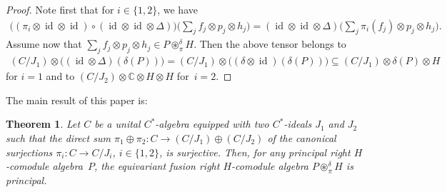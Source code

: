 \documentclass[pdftex]{sigma}
\numberwithin{equation}{section}
\newtheorem{Theorem}{Theorem}[section]
\begin{document}
\begin{proof}
Note f\/irst that for $i\in\{1,2\}$, we have
\begin{gather*}
\big((\pi_i\otimes\operatorname{id}\otimes\operatorname{id})\circ(\operatorname{id}\otimes\operatorname{id}\otimes\Delta)\big)\!\bigg(\sum_j f_j\otimes p_j\otimes h_j\bigg)
=(\operatorname{id}\otimes\operatorname{id}\otimes\Delta)\!\bigg(\sum_j \pi_i(f_j) \otimes p_j\otimes h_j\bigg).
\end{gather*}
Assume now that $\sum_j f_j\otimes p_j\otimes h_j\in P\circledast^\delta_\pi H$.
 Then the above tensor belongs to
\begin{gather*}
(C/J_1)\otimes \big((\operatorname{id}\otimes\Delta)(\delta(P))\big)=
(C/J_1)\otimes \big((\delta\otimes\operatorname{id})(\delta(P))\big)
\subseteq(C/J_1)\otimes \delta(P)\otimes H
\end{gather*}
for $i=1$ and to $(C/J_2)\otimes \mathbb{C}\otimes H\otimes H$ for~$i=2$.
\end{proof}

The main result of this paper is:
\begin{Theorem}\label{main}
Let $C$ be a unital $C^*$-algebra equipped with two $C^*$-ideals $J_1$ and $ J_2$
such that the direct sum
$
\pi_1\oplus\pi_2\colon C\rightarrow (C/J_1) \oplus (C/J_2)
$
of the canonical surjections $\pi_i\colon C\to C/J_i$, $i\in \{1,2\}$, is surjective.
Then, for any principal right $H$-comodule algebra~$P$,
 the equivariant fusion right $H$-comodule algebra $P{\circledast}^\delta_\pi H$ is principal.
\end{Theorem}
\end{document}
